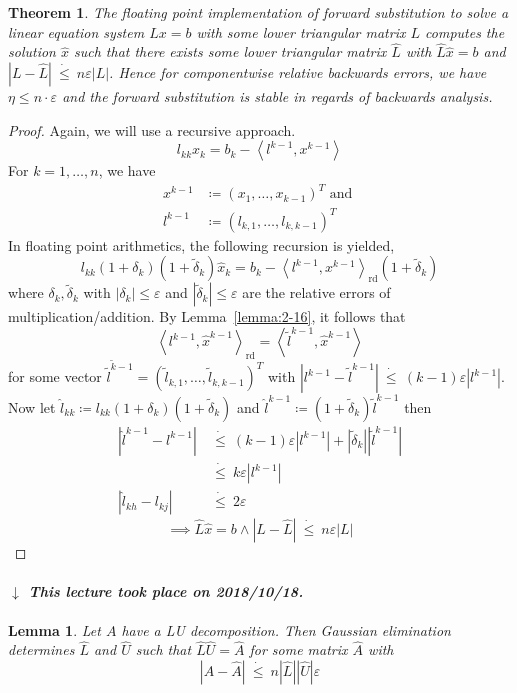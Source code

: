 \documentclass[a4paper]{article}
\newcounter{lecref}[section]
\numberwithin{lecref}{section}
\theoremstyle{break}
\newtheorem{thm}[lecref]{Theorem}
\newtheorem{lemma}[lecref]{Lemma}
\newcommand{\dateref}[1]{%
  \begin{mdframed}[backgroundcolor=gray!10,innerbottommargin=0pt,innertopmargin=0pt]
    \paragraph{\textit{$\downarrow$ This lecture took place on #1.}}%
  \end{mdframed}%
}
\newcommand{\Abs}[1]{\left|#1\right|}
\newcommand{\IP}[2]{\left\langle#1, #2\right\rangle}
\newcommand{\dotted}[1]{\:\dot{#1}\:}  %
\begin{document}
\begin{thm}
  \label{theorem:2-17}
  The floating point implementation of forward substitution to solve a linear equation system $Lx = b$ with some lower triangular matrix $L$ computes the solution $\hat{x}$ such that there exists some lower triangular matrix $\hat L$ with $\hat L \hat x = b$ and $\Abs{L - \hat L} \dotted{\leq} n \varepsilon \Abs{L}$.
  Hence for componentwise relative backwards errors, we have $\eta \leq n \cdot \varepsilon$ and the forward substitution is stable in regards of backwards analysis.
\end{thm}
\begin{proof}
  Again, we will use a recursive approach.
  \[ l_{kk} x_k = b_k - \IP{l^{k-1}}{x^{k-1}} \]
  For $k = 1, \dots, n$, we have
  \begin{align*}
    x^{k-1} &\coloneqq (x_1, \dots, x_{k-1})^T \text{ and } \\
    l^{k-1} &\coloneqq (l_{k,1}, \dots, l_{k,k-1})^T
  \end{align*}
  In floating point arithmetics, the following recursion is yielded,
  \[ l_{kk}(1 + \delta_k)(1 + \tilde \delta_k) \hat{x}_k = b_k - \IP{l^{k-1}}{x^{k-1}}_{\operatorname{rd}} (1 + \tilde \delta_k) \]
  where $\delta_k, \tilde \delta_k$ with $\Abs{\delta_k} \leq \varepsilon$ and $\Abs{\tilde\delta_k} \leq \varepsilon$ are the relative errors of multiplication/addition.
  By Lemma~\ref{lemma:2-16}, it follows that
  \[ \IP{l^{k-1}}{\hat{x}^{k-1}}_{\operatorname{rd}} = \IP{\tilde l^{k-1}}{\hat{x}^{k-1}} \]
  for some vector $\tilde l^{\tilde k - 1} = (\tilde l_{k,1}, \dots, \tilde l_{k,k-1})^T$
  with $\Abs{l^{k-1} - \tilde l^{k-1}} \dotted{\leq} (k - 1) \varepsilon \Abs{l^{k-1}}$.
  Now let $\hat{l}_{kk} \coloneqq l_{kk} (1 + \delta_k)(1 + \tilde \delta_k)$ and $\hat{l}^{k-1} \coloneqq (1 + \tilde \delta_k) \tilde l^{k-1}$ then
  \begin{align*}
    \Abs{\hat{l}^{k-1} - l^{k-1}} &\dotted{\leq} (k-1) \varepsilon \Abs{l^{k-1}} + \Abs{\tilde \delta_k} \Abs{\tilde l^{k-1}} \\
      &\dotted{\leq} k \varepsilon \Abs{l^{k-1}} \\
    \Abs{\hat{l}_{kh} - l_{kj}} &\dotted{\leq} 2 \varepsilon
  \end{align*}
  \[ \implies \hat{L} \hat{x} = b \land \Abs{L - \hat{L}} \dotted{\leq} n \varepsilon \Abs{L} \]
\end{proof}

\dateref{2018/10/18}

\begin{lemma}
  \label{lemma:2-18}
  Let $A$ have a LU decomposition. Then Gaussian elimination determines $\hat L$ and $\hat U$ such that $\hat L \hat U = \hat A$ for some matrix $\hat A$ with
  \[ \Abs{A - \hat A} \dotted{\leq} n \Abs{\hat L} \Abs{\hat U} \varepsilon \]
\end{lemma}
\end{document}
